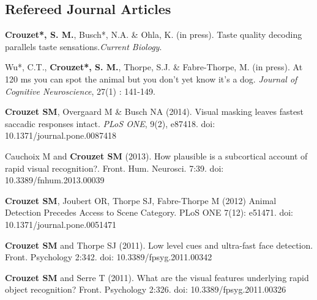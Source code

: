 \documentclass[margin,line]{resume}
\begin{document}
\begin{resume}


	\vspace{3mm}	
    \section{\mysidestyle Refereed Journal Articles}
	\textbf{Crouzet*, S. M.}, Busch*, N.A. \& Ohla, K. (in press). Taste quality decoding parallels taste sensations.\textit{Current Biology}.	
		
	\vspace{-2mm}  Wu*, C.T.,  \textbf{Crouzet*, S. M.}, Thorpe, S.J. \& Fabre-Thorpe, M. (in press). At 120 ms you can spot the animal but you don't yet know it's a dog. \textit{Journal of Cognitive Neuroscience},  27(1) : 141-149.
			
  	\vspace{-2mm}  \textbf{Crouzet SM}, Overgaard M \& Busch NA (2014). Visual masking leaves fastest saccadic responses intact. \textit{PLoS ONE}, 9(2), e87418. doi: 10.1371/journal.pone.0087418

  	\vspace{-2mm} Cauchoix M and \textbf{Crouzet SM} (2013). How plausible is a subcortical account of rapid visual recognition?. Front. Hum. Neurosci. 7:39. doi: 10.3389/fnhum.2013.00039
	
	\vspace{-2mm} \textbf{Crouzet SM}, Joubert OR, Thorpe SJ, Fabre-Thorpe M (2012) Animal Detection Precedes Access to Scene Category. PLoS ONE 7(12): e51471. doi: 10.1371/journal.pone.0051471

	\vspace{-2mm} \textbf{Crouzet SM} and Thorpe SJ (2011). Low level cues and ultra-fast face detection. Front. Psychology 2:342. doi: 10.3389/fpsyg.2011.00342

	\newpage
	
	\vspace{-2mm} \textbf{Crouzet SM} and Serre T (2011). What are the visual features underlying rapid object recognition? Front. Psychology 2:326. doi: 10.3389/fpsyg.2011.00326


\end{resume}
\end{document}
